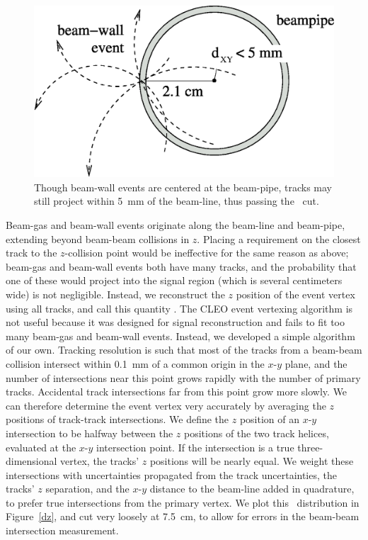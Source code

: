 \documentclass{cornell}
\begin{document}
\begin{figure}[t]
  \begin{center}
    \includegraphics[width=0.6\linewidth]{biastowardzero}
  \end{center}
  \caption[How beam-wall events project tracks within 5~mm of the
  beam-line]{\label{biastowardzero} Though beam-wall events are
  centered at the beam-pipe, tracks may still project within 5~mm of
  the beam-line, thus passing the \dxy\ cut.}
\end{figure}

Beam-gas and beam-wall events originate along the beam-line and
beam-pipe, extending beyond beam-beam collisions in $z$.  Placing a
requirement on the closest track to the $z$-collision point would be
ineffective for the same reason as above; beam-gas and beam-wall
events both have many tracks, and the probability that one of these
would project into the signal region (which is several centimeters
wide) is not negligible.  Instead, we reconstruct the $z$ position of
the event vertex using all tracks, and call this quantity \dz.  The
CLEO event vertexing algorithm is not useful because it was designed
for signal reconstruction and fails to fit too many beam-gas and
beam-wall events.  Instead, we developed a simple algorithm of our
own.  Tracking resolution is such that most of the tracks from a
beam-beam collision intersect within 0.1~mm of a common origin in the
$x$-$y$ plane, and the number of intersections near this point grows
rapidly with the number of primary tracks.  Accidental track
intersections far from this point grow more slowly.  We can therefore
determine the event vertex very accurately by averaging the $z$
positions of track-track intersections.  We define the $z$ position of
an $x$-$y$ intersection to be halfway between the $z$ positions of the
two track helices, evaluated at the $x$-$y$ intersection point.  If
the intersection is a true three-dimensional vertex, the tracks' $z$
positions will be nearly equal.  We weight these intersections with
uncertainties propagated from the track uncertainties, the tracks' $z$
separation, and the $x$-$y$ distance to the beam-line added in
quadrature, to prefer true intersections from the primary vertex.  We
plot this \dz\ distribution in Figure~\ref{dz}, and cut very loosely
at 7.5~cm, to allow for errors in the beam-beam intersection
measurement.
\end{document}
